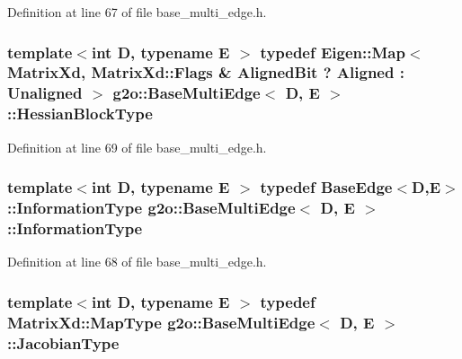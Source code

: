Definition at line 67 of file base\+\_\+multi\+\_\+edge.\+h.

\subsubsection[{\texorpdfstring{Hessian\+Block\+Type}{HessianBlockType}}]{\setlength{\rightskip}{0pt plus 5cm}template$<$int D, typename E $>$ typedef Eigen\+::\+Map$<$Matrix\+Xd, Matrix\+Xd\+::\+Flags \& Aligned\+Bit ? Aligned \+: Unaligned $>$ {\bf g2o\+::\+Base\+Multi\+Edge}$<$ D, E $>$\+::{\bf Hessian\+Block\+Type}}\hypertarget{classg2o_1_1BaseMultiEdge_af299cc8f77d917c1ad4a7d8004aec3a1}{}\label{classg2o_1_1BaseMultiEdge_af299cc8f77d917c1ad4a7d8004aec3a1}


Definition at line 69 of file base\+\_\+multi\+\_\+edge.\+h.

\subsubsection[{\texorpdfstring{Information\+Type}{InformationType}}]{\setlength{\rightskip}{0pt plus 5cm}template$<$int D, typename E $>$ typedef {\bf Base\+Edge}$<$D,E$>$\+::{\bf Information\+Type} {\bf g2o\+::\+Base\+Multi\+Edge}$<$ D, E $>$\+::{\bf Information\+Type}}\hypertarget{classg2o_1_1BaseMultiEdge_a368ab136a2cee049549cb479fb4c88fa}{}\label{classg2o_1_1BaseMultiEdge_a368ab136a2cee049549cb479fb4c88fa}


Definition at line 68 of file base\+\_\+multi\+\_\+edge.\+h.

\subsubsection[{\texorpdfstring{Jacobian\+Type}{JacobianType}}]{\setlength{\rightskip}{0pt plus 5cm}template$<$int D, typename E $>$ typedef Matrix\+Xd\+::\+Map\+Type {\bf g2o\+::\+Base\+Multi\+Edge}$<$ D, E $>$\+::{\bf Jacobian\+Type}}\hypertarget{classg2o_1_1BaseMultiEdge_a43dfdf5b27df296a32ee5a11f0653d55}{}\label{classg2o_1_1BaseMultiEdge_a43dfdf5b27df296a32ee5a11f0653d55}


